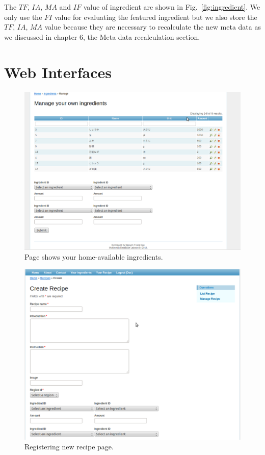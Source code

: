 The $TF$, $IA$, $MA$ and $IF$ value of ingredient are shown in Fig.~\ref{fig:ingredient}. We only use the $FI$ value for evaluating the featured ingredient but we also store the $TF$, $IA$, $MA$ value because they are necessary to recalculate the new meta data as we discussed in chapter 6, the Meta data recalculation section.



\section{Web Interfaces}


\begin{figure}
\centering
\includegraphics[scale=0.5]{your_ingredient.eps}
\caption{Page shows your home-available ingredients.}
\label{fig:your_ingredient}
\end{figure}

\begin{figure}
\centering
\includegraphics[scale=0.5]{register_recipe.eps}
\caption{Registering new recipe page.}
\label{fig:register_recipe}
\end{figure}

